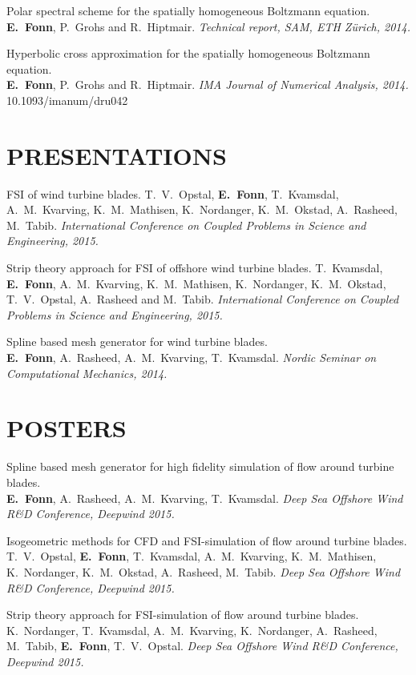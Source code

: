 \documentclass[line,margin]{res}
\newcommand{\zh}{Z\"{u}rich}
\begin{document}
\begin{resume}
Polar spectral scheme for the spatially homogeneous Boltzmann equation. \\
{\bf E.~Fonn}, P.~Grohs and R.~Hiptmair.
{\em Technical report, SAM, ETH \zh, 2014.}

Hyperbolic cross approximation for the spatially homogeneous Boltzmann equation. \\
{\bf E.~Fonn}, P.~Grohs and R.~Hiptmair.
{\em IMA Journal of Numerical Analysis, 2014.} \\
10.1093/imanum/dru042


\section{PRESENTATIONS}

FSI of wind turbine blades.
T.~V.~Opstal, {\bf E.~Fonn}, T.~Kvamsdal, A.~M.~Kvarving, K.~M.~Mathisen,
K.~Nordanger, K.~M.~Okstad, A.~Rasheed, M.~Tabib.
{\em {} International Conference on Coupled Problems in Science and Engineering, 2015.}

Strip theory approach for FSI of offshore wind turbine blades.
T.~Kvamsdal, {\bf E.~Fonn}, A.~M.~Kvarving, K.~M.~Mathisen, K.~Nordanger,
K.~M.~Okstad, T.~V.~Opstal, A.~Rasheed and M.~Tabib.
{\em {} International Conference on Coupled Problems in Science and Engineering, 2015.}

Spline based mesh generator for wind turbine blades. \\
{\bf E.~Fonn}, A.~Rasheed, A.~M.~Kvarving, T.~Kvamsdal.
{\em {} Nordic Seminar on Computational Mechanics, 2014.}


\section{POSTERS}

Spline based mesh generator for high fidelity simulation of flow around turbine blades. \\
{\bf E.~Fonn}, A.~Rasheed, A.~M.~Kvarving, T.~Kvamsdal.
{\em {} Deep Sea Offshore Wind R\&D Conference, Deepwind 2015.}

Isogeometric methods for CFD and FSI-simulation of flow around turbine blades. \\
T.~V.~Opstal, {\bf E.~Fonn}, T.~Kvamsdal, A.~M.~Kvarving, K.~M.~Mathisen,
K.~Nordanger, K.~M.~Okstad, A.~Rasheed, M.~Tabib.
{\em {} Deep Sea Offshore Wind R\&D Conference, Deepwind 2015.}

Strip theory approach for FSI-simulation of flow around turbine blades. \\
K.~Nordanger, T.~Kvamsdal, A.~M.~Kvarving, K.~Nordanger, A.~Rasheed, M.~Tabib,
{\bf E.~Fonn}, T.~V.~Opstal.
{\em {} Deep Sea Offshore Wind R\&D Conference, Deepwind 2015.}


\end{resume}
\end{document}
